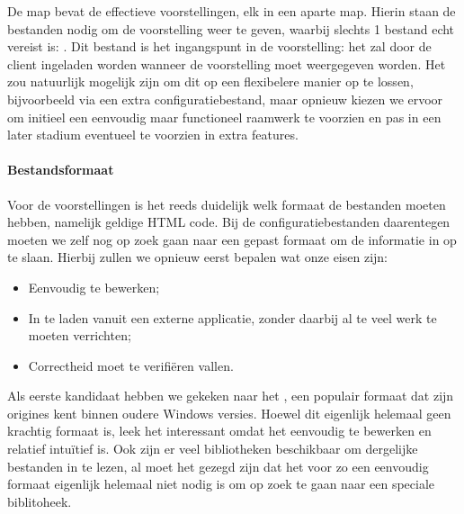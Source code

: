 De  map bevat de effectieve voorstellingen, elk in een aparte map. Hierin staan de bestanden nodig om de voorstelling weer te geven, waarbij slechts 1 bestand echt vereist is: . Dit bestand is het ingangspunt in de voorstelling: het zal door de client ingeladen worden wanneer de voorstelling moet weergegeven worden. Het zou natuurlijk mogelijk zijn om dit op een flexibelere manier op te lossen, bijvoorbeeld via een extra configuratiebestand, maar opnieuw kiezen we ervoor om initieel een eenvoudig maar functioneel raamwerk te voorzien en pas in een later stadium eventueel te voorzien in extra features.

\paragraph{Bestandsformaat}

Voor de voorstellingen is het reeds duidelijk welk formaat de bestanden moeten hebben, namelijk geldige HTML code. Bij de configuratiebestanden daarentegen moeten we zelf nog op zoek gaan naar een gepast formaat om de informatie in op te slaan. Hierbij zullen we opnieuw eerst bepalen wat onze eisen zijn:
\begin{itemize}
  \item Eenvoudig te bewerken;
  \item In te laden vanuit een externe applicatie, zonder daarbij al te veel werk te moeten verrichten;
  \item Correctheid moet te verifiëren vallen.
\end{itemize}

Als eerste kandidaat hebben we gekeken naar het , een populair  formaat dat zijn origines kent binnen oudere Windows versies. Hoewel dit eigenlijk helemaal geen krachtig formaat is, leek het interessant omdat het eenvoudig te bewerken en relatief intuïtief is. Ook zijn er veel bibliotheken beschikbaar om dergelijke bestanden in te lezen, al moet het gezegd zijn dat het voor zo een eenvoudig formaat eigenlijk helemaal niet nodig is om op zoek te gaan naar een speciale biblitoheek.


